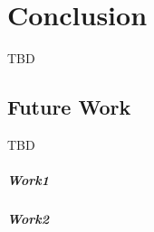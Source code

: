 \chapter{Conclusion}
\label{ch:conclusion}

TBD

\section{Future Work}

TBD

\paragraph{Work1}


\paragraph{Work2}


